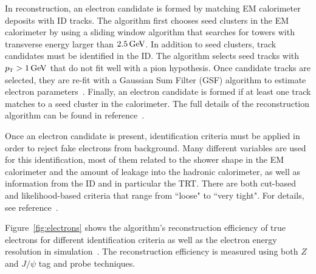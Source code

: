 In reconstruction, an electron candidate is formed by matching EM calorimeter deposits with ID tracks. The algorithm first chooses seed clusters in the EM calorimeter by using a sliding window algorithm that searches for towers with transverse energy larger than $2.5 \GeV$. In addition to seed clusters, track candidates must be identified in the ID. The algorithm selects seed tracks with $\pT > 1 \GeV$ that do not fit well with a pion hypothesis. Once candidate tracks are selected, they are re-fit with a Gaussian Sum Filter (GSF) algorithm to estimate electron parameters~\cite{GSF}. Finally, an electron candidate is formed if at least one track matches to a seed cluster in the calorimeter. The full details of the reconstruction algorithm can be found in reference~\cite{ElectronReco}.

Once an electron candidate is present, identification criteria must be applied in order to reject fake electrons from background. Many different variables are used for this identification, most of them related to the shower shape in the EM calorimeter and the amount of leakage into the hadronic calorimeter, as well as information from the ID and in particular the TRT. There are both cut-based and likelihood-based criteria that range from ``loose" to ``very tight". For details, see reference~\cite{ElectronReco}. 

Figure~\ref{fig:electrons} shows the algorithm's reconstruction efficiency of true electrons for different identification criteria as well as the electron energy resolution in simulation~\cite{ElectronReco,ElectronCalib}. The reconstruction efficiency is measured using both $Z$ and $J/\psi$ tag and probe techniques. 

